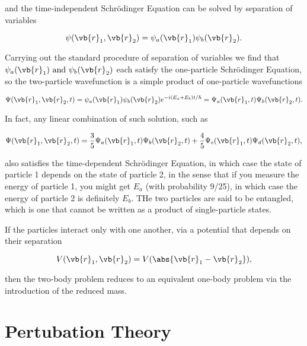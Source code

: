 \documentclass[a4paper,12pt]{report}
\begin{document}
and the time-independent Schrödinger Equation can be solved by separation of variables 

\begin{equation}
  \psi (\vb{r} _{1},\vb{r} _{2}  ) = \psi _{a}(\vb{r} _{1} )\psi _{b}(\vb{r} _{2} ).  
\end{equation}

Carrying out the standard procedure of separation of variables we find that \(\psi _{a}(\vb{r} _{1} ) \text { and } \psi _{b}(\vb{r} _{2} )  \) each satisfy the one-particle Schrödinger Equation, so the two-particle wavefunction is a simple product of one-particle wavefunctions

\begin{equation}
  \Psi (\vb{r} _{1},\vb{r} _{2},t  ) = \psi _{a}(\vb{r} _{1} )\psi _{b}(\vb{r} _{2} ) e^{-i (E_{a}+E_{b}  )t /\hbar } = \Psi _{a}(\vb{r} _{1},t )\Psi _{b}(\vb{r} _{2},t ).    
\end{equation}

In fact, any linear combination of such solution, such as 

\begin{equation}
  \Psi (\vb{r} _{1},\vb{r} _{2},t  ) = \frac{3}{5} \Psi _{a}(\vb{r} _{1} ,t) \Psi _{b}(\vb{r} _{2},t ) + \frac{4}{5} \Psi _{c}(\vb{r} _{1},t ) \Psi _{d}(\vb{r} _{2},t ),    
\end{equation}

also satisfies the time-dependent Schrödinger Equation, in which case the state of particle 1 depends on the state of particle 2, in the sense that if you measure the energy of particle 1, you might get \(E_{a} \) (with probability 9/25), in which case the energy of particle 2 is definitely \(E_{b} \). THe two particles are said to be entangled, which is one that cannot be written as a product of single-particle states.  

If the particles interact only with one another, via a potential that depends on their separation 

\begin{equation}
  V(\vb{r} _{1}, \vb{r} _{2}  ) = V(\abs{\vb{r} _{1}-\vb{r} _{2}  } ), 
\end{equation}

then the two-body problem reduces to an equivalent one-body problem via the introduction of the reduced mass.

\chapter{Pertubation Theory}
\end{document}
